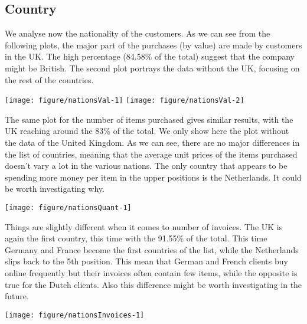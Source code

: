 \documentclass[12pt,a4paper,oneside,italian]{book}\usepackage{knitr}
\begin{document}
\subsection*{Country}





We analyse now the nationality of the customers.
As we can see from the following plots, the major part of the purchases (by value) are made by customers in the UK. The high percentage (84.58\% of the total) suggest that the company might be British. 
The second plot portrays the data without the UK, focusing on the rest of the countries.
\\




{\centering \texttt{[image: figure/nationsVal-1]} 
\texttt{[image: figure/nationsVal-2]} 

}





The same plot for the number of items purchased gives similar results, with the UK reaching around the 83\% of the total. We only show here the plot without the data of the United Kingdom. As we can see, there are no major differences in the list of countries, meaning that the average unit prices of the items purchased doesn't vary a lot in the various nations.
The only country that appears to be spending more money per item in the upper positions is the Netherlands. It could be worth investigating why.
\\



{\centering \texttt{[image: figure/nationsQuant-1]} 

}





Things are slightly different when it comes to number of invoices.
The UK is again the first country, this time with the 91.55\% of the total.
This time Germany and France become the first countries of the list, while the Netherlands slips back to the 5th position. This mean that German and French clients buy online frequently but their invoices often contain few items, while the opposite is true for the Dutch clients.
Also this difference might be worth investigating in the future.
\\




{\centering \texttt{[image: figure/nationsInvoices-1]} 

}
\end{document}
